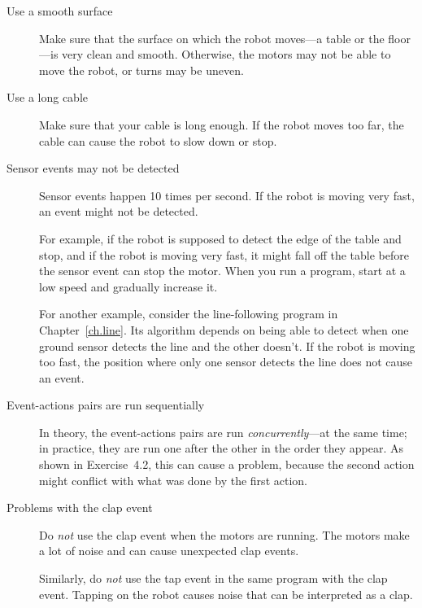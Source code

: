 \begin{description}

\item[Use a smooth surface] Make sure that the surface on which the
robot moves---a table or the floor---is very clean and smooth.
Otherwise, the motors may not be able to move the robot, or turns may be
uneven.

\item[Use a long cable] Make sure that your cable is long enough. If the
robot moves too far, the cable can cause the robot to slow down or stop.

\item[Sensor events may not be detected] Sensor events happen 10 times
per second. If the robot is moving very fast, an event might not be
detected.

For example, if the robot is supposed to detect the edge of the table
and stop, and if the robot is moving very fast, it might fall off the
table before the sensor event can stop the motor. When you run a
program, start at a low speed and gradually increase it.

For another example, consider the line-following program in
Chapter~\ref{ch.line}. Its algorithm depends on being able to detect
when one ground sensor detects the line and the other doesn't. If the
robot is moving too fast, the position where only one sensor detects
the line does not cause an event.

\item[Event-actions pairs are run sequentially] In theory, the
event-actions pairs are run \emph{concurrently}---at the same time; in
practice, they are run one after the other in the order they appear. As
shown in Exercise~4.2, this can cause a problem, because the second
action might conflict with what was done by the first action.

\item[Problems with the clap event] Do \emph{not} use the clap event
 when the motors are running. The motors make a lot of
noise and can cause unexpected clap events.

Similarly, do \emph{not} use the tap event  in the same
program with the clap event. Tapping on the robot causes noise that can
be interpreted as a clap.

\end{description}

